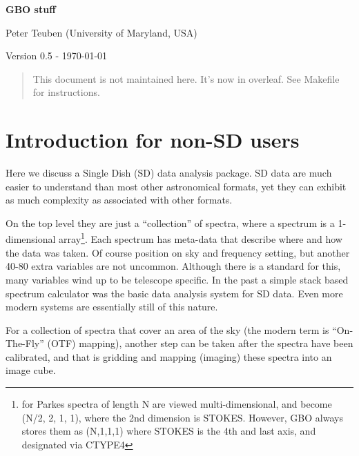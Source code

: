 \documentclass[12pt,a4paper]{article}
\begin{document}
\pagestyle{plain}
 

\begin{center}
{\Large{\bf{  GBO stuff  \\  }}} 

\end{center}
\bigskip

\centerline{Peter Teuben (University of Maryland, USA)}

\centerline{Version 0.5 - \today}
\bigskip

\begin{abstract}

This document is not maintained here. It's now in overleaf. See Makefile for instructions.
  
\end{abstract}

\section{Introduction for non-SD users}

Here we discuss a Single Dish (SD) data analysis package.  SD data are
much easier to understand than most other astronomical formats,
yet they can exhibit as much complexity as associated with other formats.

On the top level they are just a ``collection'' of spectra, where a
spectrum is a 1-dimensional array\footnote{for Parkes spectra
  of length N are viewed multi-dimensional, and
  become (N/2, 2, 1, 1), where the 2nd dimension is STOKES.   However, GBO
  always stores them as (N,1,1,1) where STOKES is the 4th and last axis,
  and designated via CTYPE4}. Each spectrum has meta-data that describe
where and how the data was taken. Of course position on sky and
frequency setting, but another 40-80 extra variables are not uncommon.
Although there is a standard for this, many variables wind up to be telescope
specific. In the past a simple stack based spectrum calculator was the
basic data analysis system for SD data.
Even more modern systems are essentially still of this nature.
 
For a collection of spectra that cover an area of the sky (the modern
term is ``On-The-Fly'' (OTF) mapping), another step can be taken after
the spectra have been calibrated, and that is gridding and mapping
(imaging) these spectra into an image cube.
\end{document}
